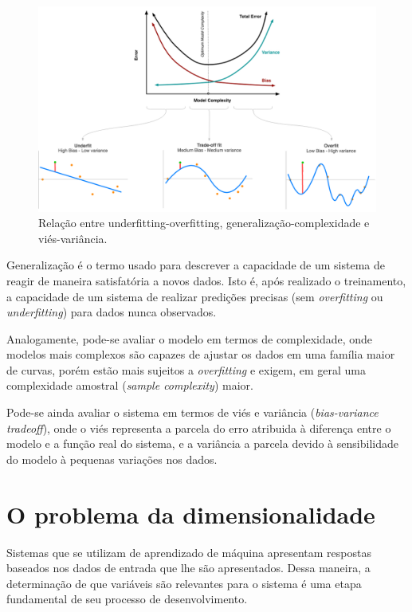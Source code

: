 \begin{figure}[H]
    \caption{Relação entre underfitting-overfitting, generalização-complexidade e viés-variância.}
    \begin{center}
    \includegraphics[width=\linewidth]{imgs/intro/over_underfitting}
    \end{center}
    \label{fig:over_underfitting}
\end{figure}

Generalização é o termo usado para descrever a capacidade de um sistema de reagir de maneira satisfatória a novos dados. Isto é, após realizado o treinamento, a capacidade de um sistema de realizar predições precisas (sem \textit{overfitting} ou \textit{underfitting}) para dados nunca observados.

Analogamente, pode-se avaliar o modelo em termos de complexidade, onde modelos mais complexos são capazes de ajustar os dados em uma família maior de curvas, porém estão mais sujeitos a \textit{overfitting} e exigem, em geral uma complexidade amostral (\textit{sample complexity}) maior.

Pode-se ainda avaliar o sistema em termos de viés e variância (\textit{bias-variance tradeoff}), onde o viés representa a parcela do erro atribuida à diferença entre o modelo e a função real do sistema, e a variância a parcela devido à sensibilidade do modelo à pequenas variações nos dados.

\section{O problema da dimensionalidade}

Sistemas que se utilizam de aprendizado de máquina apresentam respostas baseados nos dados de entrada que lhe são apresentados. Dessa maneira, a determinação de que variáveis são relevantes para o sistema é uma etapa fundamental de seu processo de desenvolvimento.

